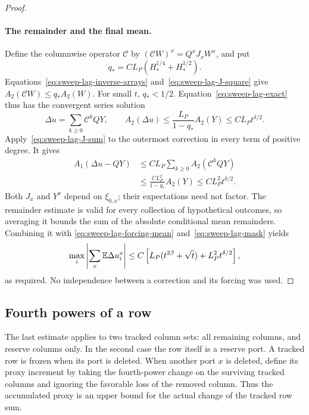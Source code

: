 \begin{proof}
\paragraph{The remainder and the final mean.}
Define the columnwise operator \(\mathcal C\) by
\((\mathcal CW)^x=Q^xJ_xW^x\), and put
\[
 q_*=CL_P(H_*^{1/4}+H_*^{1/2}).
\]
Equations~\eqref{eq:sweep-lag-inverse-arrays}
and~\eqref{eq:sweep-lag-J-square} give
\(A_2(\mathcal CW)\le q_*A_2(W)\).  For small \(t\), \(q_*<1/2\).
Equation~\eqref{eq:sweep-lag-exact} thus has the convergent
series solution
\[
 \Delta u=\sum_{k\ge0}\mathcal C^kQY,
 \qquad
 A_2(\Delta u)\le\frac{L_P}{1-q_*}A_2(Y)
                  \le CL_Pt^{\delta/2}.
\]
Apply~\eqref{eq:sweep-lag-J-sum} to the outermost correction in every
term of positive degree.  It gives
\begin{equation}\label{eq:sweep-lag-remainder}
\begin{split}
 A_1(\Delta u-QY)
 &\le CL_P\sum_{k\ge0}A_2(\mathcal C^kQY)\\
 &\le\frac{CL_P^2}{1-q_*}A_2(Y)
 \le CL_P^2t^{\delta/2}.
\end{split}
\end{equation}
Both \(J_x\) and \(Y^x\) depend on \(\xi_{0,x}\); their expectations need
not factor.  The remainder estimate is valid for every collection of
hypothetical outcomes, so averaging it bounds the sum of the absolute
conditional mean remainders.  Combining it with
\eqref{eq:sweep-lag-forcing-mean} and~\eqref{eq:sweep-lag-mask} yields
\[
 \max_i\left|\sum_x\mathbb E\Delta u_i^x\right|
 \le C\left[L_P(t^{2\beta}+\sqrt t)+L_P^2t^{\delta/2}\right],
\]
as required.  No independence between a correction and its forcing was
used.
\end{proof}


\subsection{Fourth powers of a row}

The last estimate applies to two tracked column sets: all remaining
columns, and reserve columns only. In the second case the row itself is
a reserve port. A tracked row is frozen when its port is deleted.
When another port $x$ is deleted, define its proxy increment by taking
the fourth-power change on the surviving tracked columns and ignoring
the favorable loss of the removed column. Thus the accumulated proxy
is an upper bound for the actual change of the tracked row sum.

